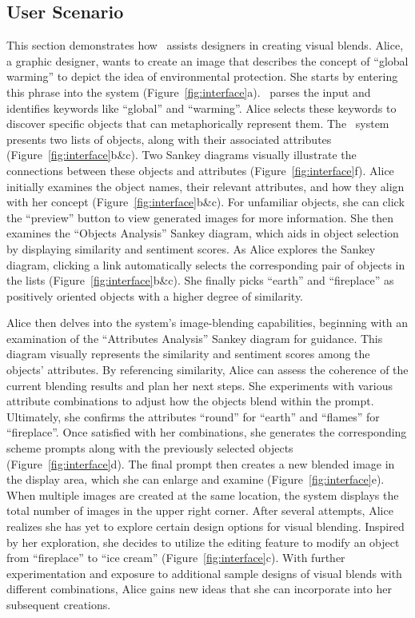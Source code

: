 \subsection{User Scenario}

This section demonstrates how \sysname\ assists designers in creating visual blends. 
Alice, a graphic designer, wants to create an image that describes the concept of ``global warming'' to depict the idea of environmental protection. 
She starts by entering this phrase into the system (Figure~\ref{fig:interface}a). 
\sysname\ parses the input and identifies keywords like ``global'' and ``warming''. 
Alice selects these keywords to discover specific objects that can metaphorically represent them.
The \sysname\ system presents two lists of objects, along with their associated attributes (Figure~\ref{fig:interface}b\&c).
Two Sankey diagrams visually illustrate the connections between these objects and attributes (Figure~\ref{fig:interface}f). 
Alice initially examines the object names, their relevant attributes, and how they align with her concept (Figure~\ref{fig:interface}b\&c).
For unfamiliar objects, she can click the ``preview'' button to view generated images for more information.
She then examines the ``Objects Analysis'' Sankey diagram, which aids in object selection by displaying similarity and sentiment scores. 
As Alice explores the Sankey diagram, clicking a link automatically selects the corresponding pair of objects in the lists (Figure~\ref{fig:interface}b\&c).
She finally picks ``earth'' and ``fireplace'' as positively oriented objects with a higher degree of similarity.






Alice then delves into the system's image-blending capabilities, beginning with an examination of the ``Attributes Analysis'' Sankey diagram for guidance.
This diagram visually represents the similarity and sentiment scores among the objects' attributes. By referencing similarity, Alice can assess the coherence of the current blending results and plan her next steps.
She experiments with various attribute combinations to adjust how the objects blend within the prompt.
Ultimately, she confirms the attributes ``round'' for ``earth'' and ``flames'' for ``fireplace''.
Once satisfied with her combinations, she generates the corresponding scheme prompts along with the previously selected objects (Figure~\ref{fig:interface}d).
The final prompt then creates a new blended image in the display area, which she can enlarge and examine (Figure~\ref{fig:interface}e). 
When multiple images are created at the same location, the system displays the total number of images in the upper right corner.
After several attempts, Alice realizes she has yet to explore certain design options for visual blending.
Inspired by her exploration, she decides to utilize the editing feature to modify an object from ``fireplace'' to ``ice cream'' (Figure~\ref{fig:interface}c). 
With further experimentation and exposure to additional sample designs of visual blends with different combinations, Alice gains new ideas that she can incorporate into her subsequent creations.


